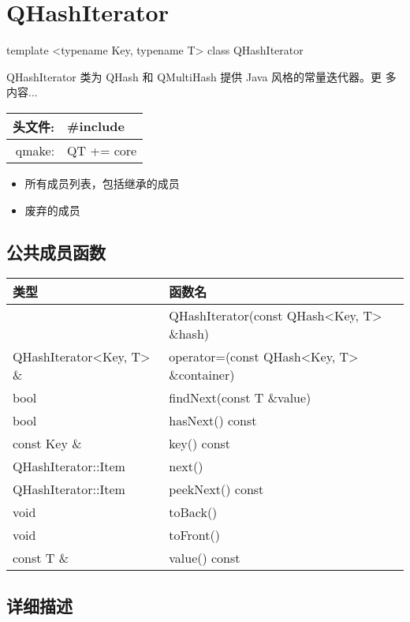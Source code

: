 \chapter{QHashIterator}

template <typename Key, typename T> class QHashIterator

QHashIterator 类为 QHash 和 QMultiHash 提供 Java 风格的常量迭代器。更
多内容...

\begin{tabular}{|r|l|}
	\hline
头文件: &	\#include\\
\hline
qmake: &	QT += core\\
	\hline
\end{tabular}

\begin{itemize}
\item 所有成员列表，包括继承的成员
\item 废弃的成员
\end{itemize}

\splitLine

\section{公共成员函数}

\begin{tabular}{|l|l|}
\hline
类型	&函数名\\
\hline
 	& QHashIterator(const QHash<Key, T> \&hash)\\
\hline
QHashIterator<Key, T> \& &	operator=(const QHash<Key, T> \&container)\\
\hline
bool &	findNext(const T \&value)\\
\hline
bool &	hasNext() const\\
\hline
const Key \& &	key() const\\
\hline
QHashIterator::Item &	next()\\
\hline
QHashIterator::Item &	peekNext() const\\
\hline
void &	toBack()\\
\hline
void &	toFront()\\
\hline
const T \& 	&value() const\\
\hline
\end{tabular}

\splitLine

\section{详细描述}

